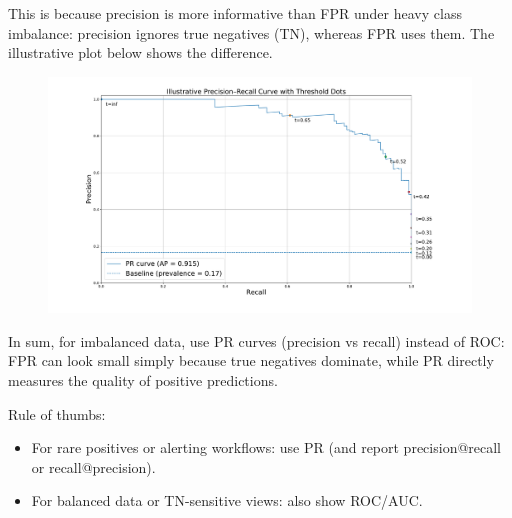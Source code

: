 This is because precision is more informative than FPR under heavy class imbalance: precision ignores true negatives (TN), whereas FPR uses them. The illustrative plot below shows the difference.

\begin{figure}[h]
	\centering
	\includegraphics[scale=0.3]{./images/evaluation_metrics/pr_curve.pdf}
\end{figure}

In sum, for imbalanced data, use PR curves (precision vs recall) instead of ROC: FPR can look small simply because true negatives dominate, while PR directly measures the quality of positive predictions.

Rule of thumbs:
\begin{itemize}
	\item For rare positives or alerting workflows: use PR (and report precision@recall or recall@precision). 
	\item For balanced data or TN-sensitive views: also show ROC/AUC.
\end{itemize}

